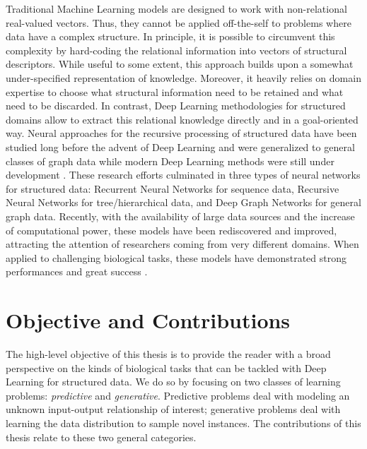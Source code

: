 Traditional Machine Learning models are designed to work with non-relational real-valued vectors. Thus, they cannot be applied off-the-self to problems where data have a complex structure. In principle, it is possible to circumvent this complexity by hard-coding the relational information into vectors of structural descriptors. While useful to some extent, this approach builds upon a somewhat under-specified representation of knowledge. Moreover, it heavily relies on domain expertise to choose what structural information need to be retained and what need to be discarded. In contrast, Deep Learning methodologies for structured domains allow to extract this relational knowledge directly and in a goal-oriented way. Neural approaches for the recursive processing of structured data have been studied long before the advent of Deep Learning \cite{elman1990rnn,hochreiter1997lstm,sperduti1997generalizedneuron,frasconi1998general} and were generalized to general classes of graph data while modern Deep Learning methods were still under development \citep{micheli2009nn4g,scarselli2009gnn}. These research efforts culminated in three types of neural networks for structured data: Recurrent Neural Networks for sequence data, Recursive Neural Networks for tree/hierarchical data, and Deep Graph Networks for general graph data. Recently, with the availability of large data sources and the increase of computational power, these models have been rediscovered and improved, attracting the attention of researchers coming from very different domains. When applied to challenging biological tasks, these models have demonstrated strong performances and great success
\cite{bianucci2000applicationcascorstructurechemistry,baldi2013recursiveneuralnets,duvenaud2015molecularfingerprint,bradshaw2019moleculechef}.

\section{Objective and Contributions}
The high-level objective of this thesis is to provide the reader with a broad perspective on the kinds of biological tasks that can be tackled with Deep Learning for structured data. We do so by focusing on two classes of learning problems: \emph{predictive} and \emph{generative}. Predictive problems deal with modeling an unknown input-output relationship of interest; generative problems deal with learning the data distribution to sample novel instances. The contributions of this thesis relate to these two general categories.

